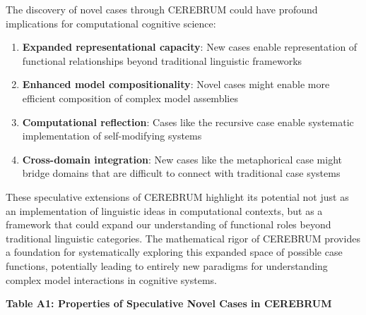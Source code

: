 The discovery of novel cases through CEREBRUM could have profound
implications for computational cognitive science:

\begin{enumerate}
\def\labelenumi{\arabic{enumi}.}
\tightlist
\item
  \textbf{Expanded representational capacity}: New cases enable
  representation of functional relationships beyond traditional
  linguistic frameworks
\item
  \textbf{Enhanced model compositionality}: Novel cases might enable
  more efficient composition of complex model assemblies
\item
  \textbf{Computational reflection}: Cases like the recursive case
  enable systematic implementation of self-modifying systems
\item
  \textbf{Cross-domain integration}: New cases like the metaphorical
  case might bridge domains that are difficult to connect with
  traditional case systems
\end{enumerate}

These speculative extensions of CEREBRUM highlight its potential not
just as an implementation of linguistic ideas in computational contexts,
but as a framework that could expand our understanding of functional
roles beyond traditional linguistic categories. The mathematical rigor
of CEREBRUM provides a foundation for systematically exploring this
expanded space of possible case functions, potentially leading to
entirely new paradigms for understanding complex model interactions in
cognitive systems.

\textbf{Table A1: Properties of Speculative Novel Cases in CEREBRUM}

